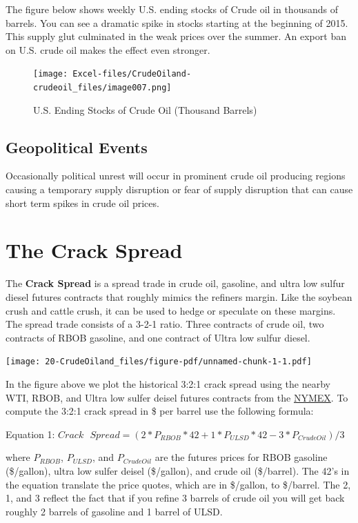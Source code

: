 \documentclass[
  letterpaper,
  DIV=11,
  numbers=noendperiod]{scrreprt}
\begin{document}
The figure below shows weekly U.S. ending stocks of Crude oil in
thousands of barrels. You can see a dramatic spike in stocks starting at
the beginning of 2015. This supply glut culminated in the weak prices
over the summer. An export ban on U.S. crude oil makes the effect even
stronger.

\begin{figure}[H]

{\centering \texttt{[image: Excel-files/CrudeOiland-crudeoil\_files/image007.png]}

}

\caption{U.S. Ending Stocks of Crude Oil (Thousand Barrels)}

\end{figure}%

\subsection{Geopolitical Events}\label{geopolitical-events}

Occasionally political unrest will occur in prominent crude oil
producing regions causing a temporary supply disruption or fear of
supply disruption that can cause short term spikes in crude oil prices.

\section{The Crack Spread}\label{the-crack-spread}

The \textbf{Crack Spread} is a spread trade in crude oil, gasoline, and
ultra low sulfur diesel futures contracts that roughly mimics the
refiners margin. Like the soybean crush and cattle crush, it can be used
to hedge or speculate on these margins. The spread trade consists of a
3-2-1 ratio. Three contracts of crude oil, two contracts of RBOB
gasoline, and one contract of Ultra low sulfur diesel.

\texttt{[image: 20-CrudeOiland\_files/figure-pdf/unnamed-chunk-1-1.pdf]}

In the figure above we plot the historical 3:2:1 crack spread using the
nearby WTI, RBOB, and Ultra low sulfer deisel futures contracts from the
\href{www.NYMEX.com}{NYMEX}. To compute the 3:2:1 crack spread in \$ per
barrel use the following formula:

Equation 1:
\(Crack \text{ } Spread = (2*P_{RBOB}*42 + 1*P_{ULSD}*42 - 3*P_{CrudeOil})/3\)

where \(P_{RBOB}\), \(P_{ULSD}\), and \(P_{CrudeOil}\) are the futures
prices for RBOB gasoline (\$/gallon), ultra low sulfer deisel
(\$/gallon), and crude oil (\$/barrel). The 42's in the equation
translate the price quotes, which are in \$/gallon, to \$/barrel. The 2,
1, and 3 reflect the fact that if you refine 3 barrels of crude oil you
will get back roughly 2 barrels of gasoline and 1 barrel of ULSD.
\end{document}
